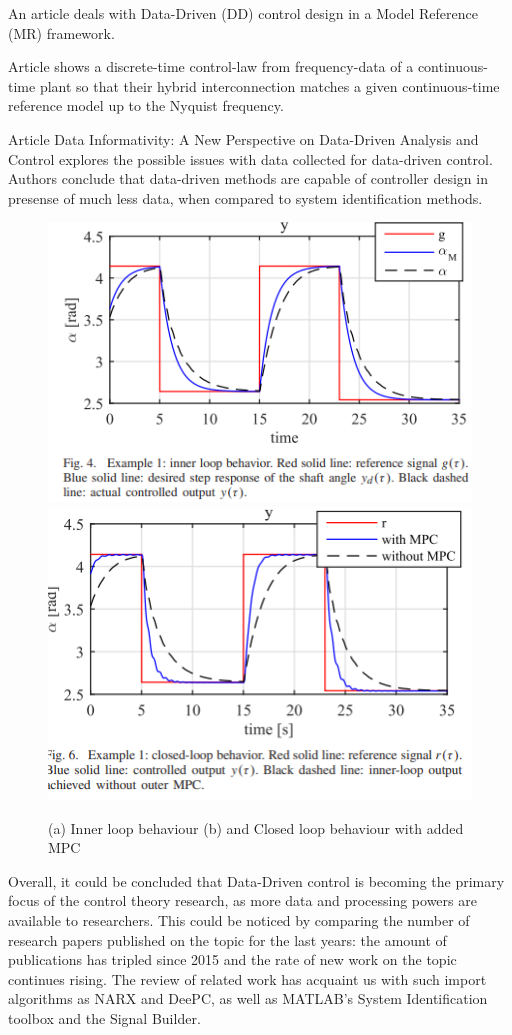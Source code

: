 \documentclass[]{final_report}
\begin{document}
An article \cite{CAMPESTRINI20172628} deals with Data-Driven (DD) control design in a Model Reference (MR) framework. 

Article \cite{vuillemin2019hybrid} shows a discrete-time control-law from frequency-data of a continuous-time plant so that their hybrid interconnection matches a given continuous-time reference model up to the Nyquist
frequency. 

Article \cite{Waarde2020} Data Informativity: A New Perspective on Data-Driven Analysis and Control explores the possible issues with data collected for data-driven control. Authors conclude that data-driven methods are capable of controller design in presense of much less data, when compared to system identification methods.

\begin{figure}
\centerline{\includegraphics[width=.49\textwidth]{Screenshots for related work/constraint_data_driven_control_screenshot2_innerloop.png}
\includegraphics[width=.49\textwidth]{Screenshots for related work/constraint_data_driven_control_screenshot2_usingMPC.png}}
\caption{(a) Inner loop behaviour (b) and Closed loop behaviour with added MPC 
\cite{piga2017direct}}
\label{fig:pidcomparison}
\end{figure}

Overall, it could be concluded that Data-Driven control is becoming the primary focus of the control theory research, as more data and processing powers are available to researchers. This could be noticed by comparing the number of research papers published on the topic for the last years: the amount of publications has tripled since 2015 and the rate of new work on the topic continues rising. The review of related work has acquaint us with such import algorithms as NARX and DeePC, as well as MATLAB's System Identification toolbox and the Signal Builder.
\end{document}
